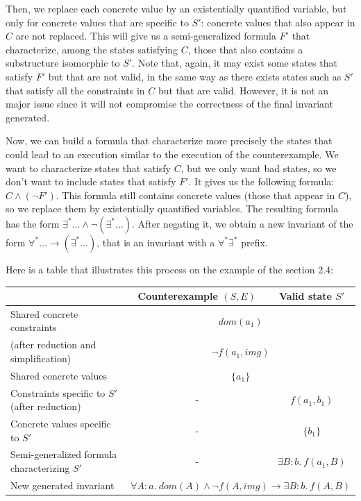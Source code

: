 \documentclass[11pt,a4paper,oldfontcommands,openany]{memoir}
\begin{document}
    Then, we replace each concrete value by an existentially quantified variable, but only for concrete values that are specific to \(S'\):
    concrete values that also appear in \(C\) are not replaced.
    This will give us a semi-generalized formula \(F'\) that characterize, among the states satisfying \(C\), those that also
    contains a substructure isomorphic to \(S'\). Note that, again, it may exist some states that satisfy \(F'\) but that are not
    valid, in the same way as there exists states such as \(S'\) that satisfy all the constraints in \(C\) but that are valid.
    However, it is not an major issue since it will not compromise the correctness of the final invariant generated.

    Now, we can build a formula that characterize more precisely the states that could lead to an execution similar to the execution of the counterexample.
    We want to characterize states that satisfy \(C\), but we only want bad states, so we don't want to include states that satisfy \(F'\).
    It gives us the following formula: \( C \land (\neg F') \).
    This formula still contains concrete values (those that appear in \(C\)), so we replace them by existentially quantified variables.
    The resulting formula has the form \( \exists^* \ldots \land \neg(\exists^* \ldots) \). After negating it, we obtain a new invariant of the form
    \( \forall^* \ldots \rightarrow (\exists^* \ldots) \), that is an invariant with a \(\forall^*\exists^*\) prefix.

    Here is a table that illustrates this process on the example of the section 2.4:

    \begin{tabular}{|l|c|c|}
        \hline
        & Counterexample \((S,E)\) & Valid state \(S'\) \\
        \hline
        Shared concrete constraints & \multicolumn{2}{c|}{\(dom(a_1)\)}\\
        (after reduction and simplification) & \multicolumn{2}{c|}{\(\neg f(a_1,img)\)}\\
        \hline
        Shared concrete values & \multicolumn{2}{c|}{\(\{ a_1 \}\)} \\
        \hline
        Constraints specific to \(S'\) (after reduction) & - & \(f(a_1,b_1)\) \\
        \hline
        Concrete values specific to \(S'\) & - & \(\{b_1\}\) \\
        \hline
        Semi-generalized formula characterizing \(S'\) & - & \(\exists B:b.\ f(a_1, B)\) \\
        \hline
        New generated invariant & \multicolumn{2}{c|}{\(\forall A:a.\ dom(A) \land \neg f(A,img) \rightarrow \exists B:b.\ f(A,B) \)}\\
        \hline
    \end{tabular}\\
\end{document}
